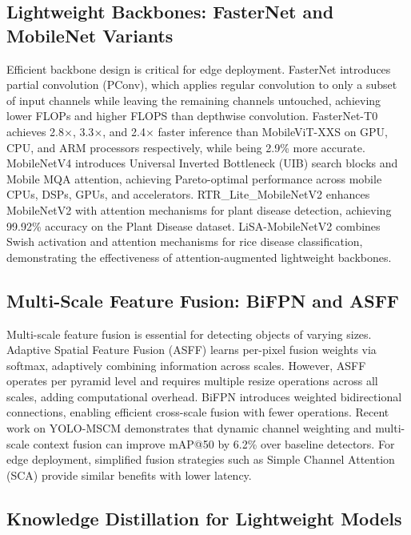 \documentclass[10pt,a4paper,twocolumn]{article}
\begin{document}
\subsection{Lightweight Backbones: FasterNet and MobileNet Variants}

Efficient backbone design is critical for edge deployment. FasterNet introduces partial convolution (PConv), which applies regular convolution to only a subset of input channels while leaving the remaining channels untouched, achieving lower FLOPs and higher FLOPS than depthwise convolution. FasterNet-T0 achieves 2.8$\times$, 3.3$\times$, and 2.4$\times$ faster inference than MobileViT-XXS on GPU, CPU, and ARM processors respectively, while being 2.9\% more accurate. MobileNetV4 \cite{qin2024mobilenetv4} introduces Universal Inverted Bottleneck (UIB) search blocks and Mobile MQA attention, achieving Pareto-optimal performance across mobile CPUs, DSPs, GPUs, and accelerators. RTR\_Lite\_MobileNetV2 \cite{duhan2025rtrlite} enhances MobileNetV2 with attention mechanisms for plant disease detection, achieving 99.92\% accuracy on the Plant Disease dataset. LiSA-MobileNetV2 \cite{xu2025lisamobilenetv2} combines Swish activation and attention mechanisms for rice disease classification, demonstrating the effectiveness of attention-augmented lightweight backbones.

\subsection{Multi-Scale Feature Fusion: BiFPN and ASFF}

Multi-scale feature fusion is essential for detecting objects of varying sizes. Adaptive Spatial Feature Fusion (ASFF) learns per-pixel fusion weights via softmax, adaptively combining information across scales. However, ASFF operates per pyramid level and requires multiple resize operations across all scales, adding computational overhead. BiFPN introduces weighted bidirectional connections, enabling efficient cross-scale fusion with fewer operations. Recent work on YOLO-MSCM \cite{zhao2025yolomscm} demonstrates that dynamic channel weighting and multi-scale context fusion can improve mAP@50 by 6.2\% over baseline detectors. For edge deployment, simplified fusion strategies such as Simple Channel Attention (SCA) provide similar benefits with lower latency.

\subsection{Knowledge Distillation for Lightweight Models}
\end{document}
